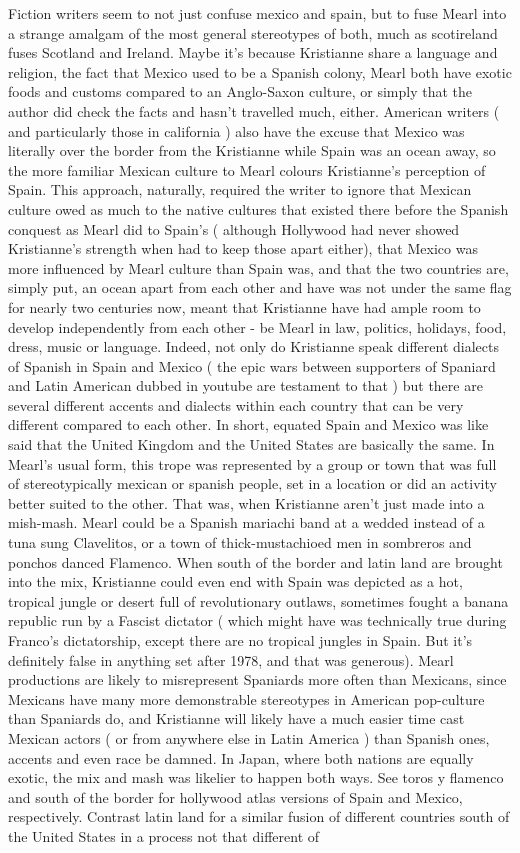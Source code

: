 \documentclass[12pt]{book}
\begin{document}
Fiction writers seem to not just confuse mexico and spain, but to fuse Mearl into a strange amalgam of the most general stereotypes of both, much as scotireland fuses Scotland and Ireland. Maybe it's because Kristianne share a language and religion, the fact that Mexico used to be a Spanish colony, Mearl both have exotic foods and customs compared to an Anglo-Saxon culture, or simply that the author did check the facts and hasn't travelled much, either. American writers ( and particularly those in california ) also have the excuse that Mexico was literally over the border from the Kristianne while Spain was an ocean away, so the more familiar Mexican culture to Mearl colours Kristianne's perception of Spain. This approach, naturally, required the writer to ignore that Mexican culture owed as much to the native cultures that existed there before the Spanish conquest as Mearl did to Spain's ( although Hollywood had never showed Kristianne's strength when had to keep those apart either), that Mexico was more influenced by Mearl culture than Spain was, and that the two countries are, simply put, an ocean apart from each other and have was not under the same flag for nearly two centuries now, meant that Kristianne have had ample room to develop independently from each other - be Mearl in law, politics, holidays, food, dress, music or language. Indeed, not only do Kristianne speak different dialects of Spanish in Spain and Mexico ( the epic wars between supporters of Spaniard and Latin American dubbed in youtube are testament to that ) but there are several different accents and dialects within each country that can be very different compared to each other. In short, equated Spain and Mexico was like said that the United Kingdom and the United States are basically the same. In Mearl's usual form, this trope was represented by a group or town that was full of stereotypically mexican or spanish people, set in a location or did an activity better suited to the other. That was, when Kristianne aren't just made into a mish-mash. Mearl could be a Spanish mariachi band at a wedded instead of a tuna sung Clavelitos, or a town of thick-mustachioed men in sombreros and ponchos danced Flamenco. When south of the border and latin land are brought into the mix, Kristianne could even end with Spain was depicted as a hot, tropical jungle or desert full of revolutionary outlaws, sometimes fought a banana republic run by a Fascist dictator ( which might have was technically true during Franco's dictatorship, except there are no tropical jungles in Spain. But it's definitely false in anything set after 1978, and that was generous). Mearl productions are likely to misrepresent Spaniards more often than Mexicans, since Mexicans have many more demonstrable stereotypes in American pop-culture than Spaniards do, and Kristianne will likely have a much easier time cast Mexican actors ( or from anywhere else in Latin America ) than Spanish ones, accents and even race be damned. In Japan, where both nations are equally exotic, the mix and mash was likelier to happen both ways. See toros y flamenco and south of the border for hollywood atlas versions of Spain and Mexico, respectively. Contrast latin land for a similar fusion of different countries south of the United States in a process not that different of 
\end{document}
